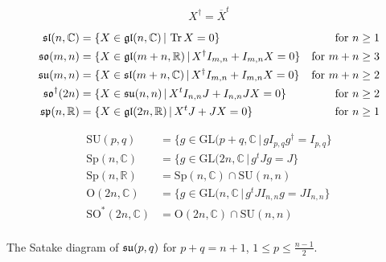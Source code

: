 \[X^\dag = \overline{X}^t\]

\begin{equation*}\label{eq:algebras_definition}
\begin{aligned}
 \mathfrak{sl}(n,\mathbb{C}) &= \{ X \in \mathfrak{gl}(n,\mathbb{C}) \,|\, \operatorname{\mathrm{Tr}} X = 0 \} & \text{for } n \geq 1\\
 \mathfrak{so}(m,n)  &= \{ X\in \mathfrak{gl}(m+n,\mathbb{R}) \,|\, X^\dag I_{m,n}+I_{m,n}X = 0 \} & \text{for } m+n\geq 3\\
 \mathfrak{su}(m,n)  &= \{ X \in \mathfrak{sl}(m+n,\mathbb{C})  \,|\, X^\dag I_{m,n}+I_{m,n}X = 0 \} & \text{for } m+n \geq 2\\
 \mathfrak{so}^\dag(2n) &= \{ X \in \mathfrak{su}(n,n) \,|\, X^t I_{n,n}J + I_{n,n} JX = 0 \} & \text{for } n \geq 2\\
 \mathfrak{sp}(n,\mathbb{R}) &= \{ X \in \mathfrak{gl}(2n,\mathbb{R}) \,|\, X^tJ + JX = 0 \} & \text{for } n\geq 1
\end{aligned}
\end{equation*}

\begin{equation*}
\begin{aligned}
\mathrm{SU}(p,q) &= \{ g \in \mathrm{GL}(p +q, \mathbb{C} \,|\, g I_{p,q}g^\dag = I_{p,q} \}\\
\mathrm{Sp}(n, \mathbb{C}) &= \{ g \in \mathrm{GL}(2n, \mathbb{C} \,|\, g^t J g  = J \}\\
\mathrm{Sp}(n, \mathbb{R}) &= \mathrm{Sp}(n, \mathbb{C}) \cap \mathrm{SU}(n,n) \\
\mathrm{O}(2n, \mathbb{C}) &= \{ g \in \mathrm{GL}(n, \mathbb{C} \,|\, g^t JI_{n,n} g  = JI_{n,n} \}\\
\mathrm{SO}^*(2n, \mathbb{C}) &=  \mathrm{O}(2n, \mathbb{C}) \cap \mathrm{SU}(n,n) \\
\end{aligned}
\end{equation*}


The Satake diagram of $\mathfrak{su}(p,q)$ for $p+q = n+1$, $1 \leq p \leq \frac{n-1}{2}$.

